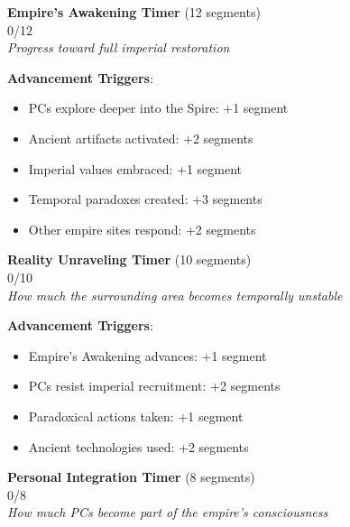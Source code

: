 \documentclass[11pt]{article}
\newcommand{\timersegment}{\textbullet}
\begin{document}
\begin{center}
\textbf{Empire's Awakening Timer } (12 segments)\\
\fbox{\timersegment\timersegment\timersegment\timersegment\timersegment\timersegment\timersegment\timersegment\timersegment\timersegment\timersegment\timersegment} 0/12\\
\textit{Progress toward full imperial restoration}
\end{center}

\textbf{Advancement Triggers}:
\begin{itemize}[leftmargin=*]
\item PCs explore deeper into the Spire: +1 segment
\item Ancient artifacts activated: +2 segments
\item Imperial values embraced: +1 segment
\item Temporal paradoxes created: +3 segments
\item Other empire sites respond: +2 segments
\end{itemize}

\begin{center}
\textbf{Reality Unraveling Timer } (10 segments)\\
\fbox{\timersegment\timersegment\timersegment\timersegment\timersegment\timersegment\timersegment\timersegment\timersegment\timersegment} 0/10\\
\textit{How much the surrounding area becomes temporally unstable}
\end{center}

\textbf{Advancement Triggers}:
\begin{itemize}[leftmargin=*]
\item Empire's Awakening advances: +1 segment
\item PCs resist imperial recruitment: +2 segments
\item Paradoxical actions taken: +1 segment
\item Ancient technologies used: +2 segments
\end{itemize}

\begin{center}
\textbf{Personal Integration Timer } (8 segments)\\
\fbox{\timersegment\timersegment\timersegment\timersegment\timersegment\timersegment\timersegment\timersegment} 0/8\\
\textit{How much PCs become part of the empire's consciousness}
\end{center}
\end{document}
